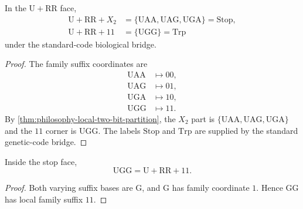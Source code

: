 \begin{theorem}
\label{thm:philosophy-stop-trp-boundary-tile}
In the $\mathrm{U}+\mathrm{RR}$ face,
$$
\begin{aligned}
  \mathrm{U}+\mathrm{RR}+X_{2}
    &=\{\mathrm{UAA},\mathrm{UAG},\mathrm{UGA}\}
      =\mathrm{Stop},\\
  \mathrm{U}+\mathrm{RR}+11
    &=\{\mathrm{UGG}\}
      =\mathrm{Trp}
\end{aligned}
$$
under the standard-code biological bridge.
\end{theorem}
\begin{proof}
The family suffix coordinates are
$$
\begin{aligned}
  \mathrm{UAA} &\longmapsto 00,\\
  \mathrm{UAG} &\longmapsto 01,\\
  \mathrm{UGA} &\longmapsto 10,\\
  \mathrm{UGG} &\longmapsto 11.
\end{aligned}
$$
By \autoref{thm:philosophy-local-two-bit-partition}, the $X_{2}$ part is
$\{\mathrm{UAA},\mathrm{UAG},\mathrm{UGA}\}$ and the $11$ corner is
$\mathrm{UGG}$. The labels $\mathrm{Stop}$ and $\mathrm{Trp}$ are supplied
by the standard genetic-code bridge.
\end{proof}

\begin{corollary}
\label{cor:philosophy-ugg-stop-face-eleven-corner}
Inside the stop face,
$$
  \mathrm{UGG}=\mathrm{U}+\mathrm{RR}+11.
$$
\end{corollary}
\begin{proof}
Both varying suffix bases are $\mathrm{G}$, and $\mathrm{G}$ has family
coordinate $1$. Hence $\mathrm{GG}$ has local family suffix $11$.
\end{proof}

